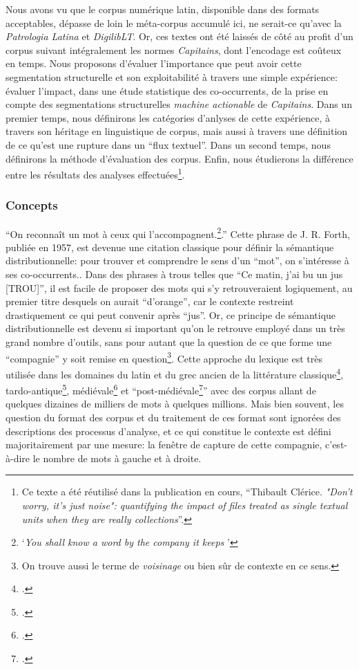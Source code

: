 Nous avons vu que le corpus numérique latin, disponible dans des formats acceptables, dépasse de loin le méta-corpus accumulé ici, ne serait-ce qu'avec la \textit{Patrologia Latina} et \textit{DigilibLT}. Or, ces textes ont été laissés de côté au profit d'un corpus suivant intégralement les normes \textit{Capitains}, dont l'encodage est coûteux en temps. Nous proposons d'évaluer l'importance que peut avoir cette segmentation structurelle et son exploitabilité à travers une simple expérience: évaluer l'impact, dans une étude statistique des co-occurrents, de la prise en compte des segmentations structurelles \textit{machine actionable} de \textit{Capitains}. Dans un premier temps, nous définirons les catégories d'anlyses de cette expérience, à travers son héritage en linguistique de corpus, mais aussi à travers une définition de ce qu'est une rupture dans un \enquote{flux textuel}. Dans un second temps, nous définirons la méthode d'évaluation des corpus. Enfin, nous étudierons la différence entre les résultats des analyses effectuées\footnote{Ce texte a été réutilisé dans la publication en cours, \enquote{Thibault Clérice. \textit{"Don't worry, it's just noise": quantifying the impact of files treated as single textual units when they are really collections}}.}.

\subsubsection{Concepts}

\enquote{On reconnaît un mot à ceux qui l'accompagnent.\footnote{\enquote{\textit{You shall know a word by the company it keeps }}\textcite{firth_papers_1957}}.} Cette phrase de J. R. Forth, publiée en 1957, est devenue une citation classique pour définir la sémantique distributionnelle: pour trouver et comprendre le sens d'un ``mot'', on s'intéresse à ses co-occurrents.. Dans des phrases à trous telles que \enquote{Ce matin, j'ai bu un jus {[TROU]}}, il est facile de proposer des mots qui s'y retrouveraient logiquement, au premier titre desquels on aurait \enquote{d'orange}, car le contexte restreint drastiquement ce qui peut convenir après \enquote{jus}. Or, ce principe de sémantique distributionnelle est devenu si important qu'on le retrouve employé dans un très grand nombre d'outils, sans pour autant que la question de ce que forme une \enquote{compagnie} y soit remise en question\footnote{On trouve aussi le terme de \textit{voisinage} ou bien sûr de contexte en ce sens.}. Cette approche du lexique est très utilisée dans les domaines du latin et du grec ancien de la littérature classique\footcite{gillivray_greek}, tardo-antique\footcite{munson_biblical_2017}, médiévale\footcite{guerreau_pourquoi_1989,perreaux:eau} et \enquote{post-médiévale\footcite{bloem-etal-2020-distributional}} avec des corpus allant de quelques dizaines de milliers de mots à quelques millions. Mais bien souvent, les question du format des corpus et du traitement de ces format sont ignorées des descriptions des processus d'analyse, et ce qui constitue le contexte est défini majoritairement par une mesure: la fenêtre de capture de cette compagnie, c'est-à-dire le nombre de mots à gauche et à droite. 


